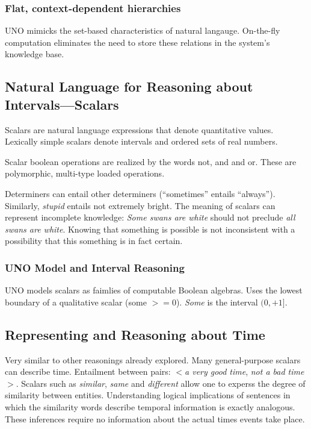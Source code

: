 \documentclass[11pt]{article}
\begin{document}
\subsubsection{Flat, context-dependent hierarchies}

UNO mimicks the set-based characteristics of natural langauge.  On-the-fly computation eliminates the need to store these relations in the system's knowledge base.

\subsection{Natural Language for Reasoning about Intervals---Scalars}

Scalars are natural language expressions that denote quantitative values.  Lexically simple scalars denote intervals and ordered sets of real numbers.

Scalar boolean operations are realized by the words not, and and or.  These are polymorphic, multi-type loaded operations.  

Determiners can entail other determiners (``sometimes'' entails ``always'').  Similarly, \emph{stupid} entails {not extremely bright}.  The meaning of scalars can represent incomplete knowledge: \emph{Some swans are white} should not preclude \emph{all swans are white}.  Knowing that something is possible is not inconsistent with a possibility that this something is in fact certain.

\subsubsection{UNO Model and Interval Reasoning}

UNO models scalars as faimlies of computable Boolean algebras.  Uses the lowest boundary of a qualitative scalar (some $>=0$).  \emph{Some} is the interval $(0,+1]$.  

\subsection{Representing and Reasoning about Time}

Very similar to other reasonings already explored.  Many general-purpose scalars can describe time.  Entailment between pairs: $<$\emph{a very good time}, \emph{not a bad time}$>$.  Scalars such as \emph{similar}, \emph{same} and \emph{different} allow one to experss the degree of similarity between entities.  Understanding logical implications of sentences in which the similarity words describe temporal information is exactly analogous. These inferences require no information about the actual times events take place.  
\end{document}
